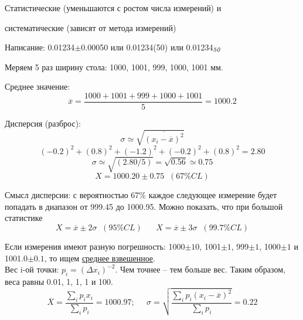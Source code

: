 \documentclass[12pt,epsfig,color,russian]{article}
\begin{document}
 Статистические (уменьшаются с ростом числа измерений) и \vspace{4mm}

 систематические (зависят от метода измерений)\vspace{4mm}

 Написание: 0.01234$\pm$0.00050 или 0.01234(50) или 0.01234$_{\it 50}$\vspace{4mm}

 Меряем 5 раз ширину стола: 1000, 1001, 999, 1000, 1001 мм.\vspace{5mm}

 Среднее значение:
 \begin{displaymath}
\overline{x} = \frac{1000 + 1001 + 999 + 1000 + 1001}{5} = 1000.2
 \end{displaymath}

 Дисперсия (разброс):
 \begin{displaymath}
\sigma \simeq \sqrt{\overline{\left( x_i-\overline{x} \right)^2}}
 \end{displaymath}
 \begin{displaymath}
(-0.2)^2 +(0.8)^2 + (-1.2)^2 + (-0.2)^2 + (0.8)^2 = 2.80
 \end{displaymath}
 \begin{displaymath}
\sigma \simeq \sqrt{(2.80/5)}=\sqrt{0.56} \simeq 0.75
 \end{displaymath}
 \begin{displaymath}
X = 1000.20\pm 0.75 \;\;(67\%CL)
 \end{displaymath}

Смысл дисперсии: с вероятностью 67\% каждое следующее измерение будет попадать в диапазон от 999.45 до 1000.95. Можно показать, что при большой статистике
\begin{displaymath}
X = \overline{x}\pm 2\sigma \;\;(95\%CL)\;\;\;\;\;\;X = \overline{x}\pm 3\sigma \;\;(99.7\%CL)
 \end{displaymath}

Если измерения имеют разную погрешность: 1000$\pm10$, 1001$\pm1$, 999$\pm1$, 1000$\pm1$ и 1001.0$\pm0.1$, то ищем \underline{среднее взвешенное}. \\
Вес i-ой точки: $p_i = \left(\Delta x_i\right)^{-2}$. Чем точнее -- тем больше вес.  Таким образом, веса равны 0.01, 1, 1, 1 и 100.
 \begin{displaymath}
\overline{X}=\frac{\sum_i p_ix_i}{\sum_i p_i}=1000.97;\;\;\;\;\;
\sigma=\sqrt{\frac{\sum_i p_i\left(x_i-\overline{x}\right)^2}{\sum_i p_i}}=0.22
 \end{displaymath}
\newpage
\end{document}
